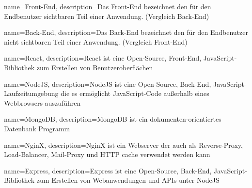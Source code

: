 {   name={Front-End},
    description={Das Front-End bezeichnet den für den Endbenutzer sichtbaren Teil einer Anwendung. (Vergleich \gls{Back-End})}
}

{   name={Back-End},
    description={Das Back-End bezeichnet den für den Endbenutzer nicht sichtbaren Teil einer Anwendung. (Vergleich \gls{Front-End})}
}

{   name={React},
    description={React ist eine Open-Source, \gls{Front-End}, JavaScript-Bibliothek zum Erstellen von Benutzeroberflächen}
}

{   name={NodeJS},
    description={NodeJS ist eine Open-Source, \gls{Back-End}, JavaScript-Laufzeitumgebung die es ermöglicht JavaScript-Code außerhalb eines Webbrowsers auszuführen}
}

{   name={MongoDB},
    description={MongoDB ist ein dokumenten-orientiertes Datenbank Programm}
}

{   name={NginX},
    description={NginX ist ein Webserver der auch als Reverse-Proxy, Load-Balancer, Mail-Proxy und HTTP cache verwendet werden kann}
}

{   name={Express},
    description={Express ist eine Open-Source, \gls{Back-End}, JavaScript-Bibliothek zum Erstellen von Webanwendungen und APIs unter \gls{NodeJS}}
}
